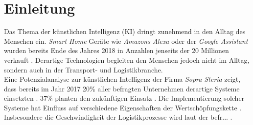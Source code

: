 
\chapter{Einleitung}
\label{ch: Einleitung}
	

		Das Thema der künstlichen Intelligenz (KI) dringt zunehmend in den Alltag des Menschen ein. \textit{Smart Home} Geräte wie \textit{Amazons Alexa} oder der \textit{Google Assistant} wurden bereits Ende des Jahres 2018 in Anzahlen jenseits der 20 Millionen verkauft \cite{smart}. Derartige Technologien begleiten den Menschen jedoch nicht im Alltag, sondern auch in der Transport- und Logistikbranche.\\
		
		Eine Potenzialanalyse zur künstlichen Intelligenz der Firma \textit{Sopra Steria} zeigt, dass bereits im Jahr 2017 20\% aller befragten Unternehmen derartige Systeme einsetzten \cite{sopra}. 37\% planten den zukünftigen Einsatz \cite{sopra}. Die Implementierung solcher Systeme hat Einfluss auf verschiedene Eigenschaften der Wertschöpfungskette \cite{sopra}. Insbesondere die Geschwindigkeit der Logistikprozesse wird laut der befr... \cite{sopra}.\\
		
